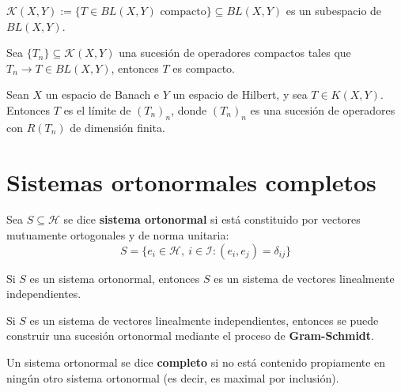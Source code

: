 \documentclass[12pt]{book}
\newcommand{\tbf}{\textbf}
\begin{document}
\begin{observacion}
    $\mathcal{K}(X, Y) := \{ T \in BL(X, Y) \text{ compacto} \} \subseteq BL(X, Y)$ es un subespacio de $BL(X, Y)$. \\
\end{observacion}


\begin{teo}
    Sea $\{T_n\} \subseteq \mathcal{K}(X, Y)$ una sucesión de operadores compactos tales que $T_n \to T\in BL(X, Y)$, entonces $T$ es compacto.
\end{teo}

\begin{prop}
    Sean $X$ un espacio de Banach e $Y$ un espacio de Hilbert, y sea $T \in K(X, Y)$. Entonces $T$ es el límite de $(T_n)_n$, donde $(T_n)_n$ es una sucesión de operadores con $R(T_n)$ de dimensión finita.
\end{prop}

\chapter{Sistemas ortonormales completos}

\begin{definicion}
    Sea $S\subseteq \mathcal{H}$ se dice \tbf{sistema ortonormal} si está constituido por vectores mutuamente ortogonales y de norma unitaria:
    \[ S = \{ e_i \in \mathcal{H}, \ i \in \mathcal{I} : (e_i, e_j) = \delta_{ij}\}\]
\end{definicion}



\begin{observacion}
    Si $S$ es un sistema ortonormal, entonces $S$ es un sistema de vectores linealmente independientes.
\end{observacion}


\begin{observacion}
    Si $S$ es un sistema de vectores linealmente independientes, entonces se puede construir una sucesión ortonormal mediante el proceso de \textbf{Gram-Schmidt}. \\
\end{observacion}


\begin{definicion}
    Un sistema ortonormal se dice \textbf{completo} si no está contenido propiamente en ningún otro sistema ortonormal (es decir, es maximal por inclusión). \\
\end{definicion}
\end{document}
